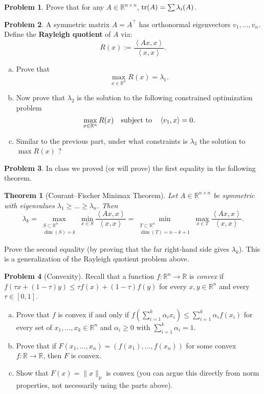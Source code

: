 \documentclass{amsart}[11pt]
\newtheorem{theorem}{Theorem}[section]
\theoremstyle{definition}
\newtheorem{problem}{Problem}
\newcommand{\R}{\mathbb{R}}
\newcommand{\bracket}[1]{\left\langle#1\right\rangle}
\newcommand{\tr}{\textnormal{tr}}
\begin{document}
\begin{problem}
Prove that for any $A\in\R^{n\times n}$, $\tr(A) = \sum\lambda_i(A)$.
\end{problem}

\begin{problem}A symmetric matrix $A=A^\top$ has orthonormal eigenvectors $v_1,\dots,v_n$. Define the \textbf{Rayleigh quotient} of $A$ via:
    \[ R(x):= \frac{\bracket{Ax,x}}{\bracket{x,x}}. \]
    
\begin{enumerate}[(a)]
    \item Prove that \[\max_{x\in\R^n} R(x) = \lambda_1.\]
    \item Now prove that $\lambda_2$ is the solution to the following constrained optimization problem
    \[ \max_{x\in\R^n} R(x) \quad \textnormal{subject to} \quad \bracket{v_1,x}=0. \]
    \item Similar to the previous part, under what constraints is $\lambda_3$ the solution to $\max R(x)$	?
\end{enumerate}
\end{problem}

\begin{problem}
 In class we proved (or will prove) the first equality in the following theorem.
\begin{theorem}[Courant--Fischer Minimax Theorem]
Let $A\in\R^{n\times n}$ be symmetric with eigenvalues $\lambda_1\geq\dots\geq\lambda_n$. Then
\[\lambda_k = \max_{\substack{S\subset\R^n\\ \dim(S)=k}}\min_{x\in S}\frac{\bracket{Ax,x}}{\bracket{x,x}} = \min_{\substack{T\subset\R^n \\ \dim(T)=n-k+1}}\max_{x\in T}\frac{\bracket{Ax,x}}{\bracket{x,x}}.\]
\end{theorem}
Prove the second equality (by proving that the far right-hand side gives $\lambda_k$). This is a generalization of the Rayleigh quotient problem above.
\end{problem}

\begin{problem}[Convexity]
Recall that a function $f:\R^n\to \R$ is \textit{convex} if $f(\tau x+(1-\tau)y)\leq \tau f(x)+(1-\tau)f(y)$ for every $x,y\in\R^n$ and every $\tau\in[0,1]$. 
\begin{enumerate}[(a)]
\item Prove that $f$ is convex if and only if $f(\sum_{i=1}^k\alpha_i x_i)\leq\sum_{i=1}^k\alpha_i f(x_i)$ for every set of $x_1,\dots,x_k\in\R^n$ and $\alpha_i\geq0$ with $\sum_{i=1}^k\alpha_i=1$.
\item Prove that if $F(x_1,\dots,x_n) = (f(x_1),\dots,f(x_n))$ for some convex $f:\R\to\R$, then $F$ is convex.
\item Show that $F(x) = \|x\|_p$ is convex (you can argue this directly from norm properties, not necessarily using the parts above).
\end{enumerate}
\end{problem}
\end{document}
